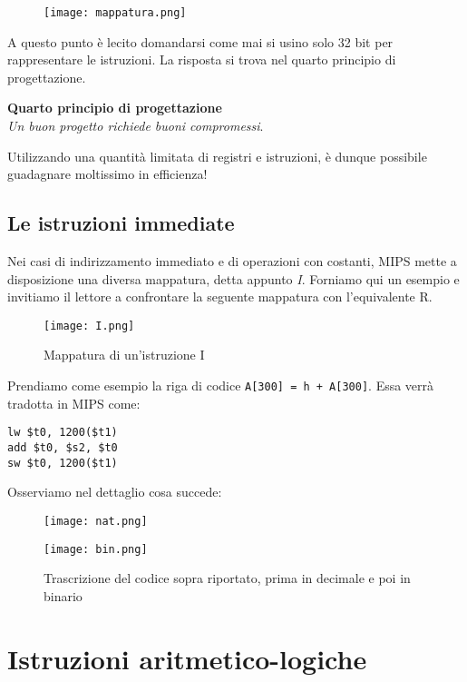 \begin{figure}[H]
	\centering
	\texttt{[image: mappatura.png]}
\end{figure}

A questo punto è lecito domandarsi come mai si usino solo 32 bit per rappresentare le istruzioni. La risposta si trova nel quarto principio di progettazione.

\vspace{8pt}
\begin{tcolorbox}
\centering
\textbf{Quarto principio di progettazione}\\
\emph{Un buon progetto richiede buoni compromessi}.
\end{tcolorbox}
\vspace{5pt}

Utilizzando una quantità limitata di registri e istruzioni, è dunque possibile guadagnare moltissimo in efficienza!

\subsection{Le istruzioni immediate}
Nei casi di indirizzamento immediato e di operazioni con costanti, MIPS mette a disposizione una diversa mappatura, detta appunto \emph{I}. Forniamo qui un esempio e invitiamo il lettore a confrontare la seguente mappatura con l'equivalente R.
\begin{figure}[H]
	\centering
	\texttt{[image: I.png]}
	\caption{Mappatura di un'istruzione I}
\end{figure}

Prendiamo come esempio la riga di codice \texttt{A[300] = h + A[300]}. Essa verrà tradotta in MIPS come:
\begin{verbatim}
lw $t0, 1200($t1)
add $t0, $s2, $t0
sw $t0, 1200($t1)
\end{verbatim}
Osserviamo nel dettaglio cosa succede:
\begin{figure}[H]
	\centering
	\texttt{[image: nat.png]}
\end{figure}
\begin{figure}[H]
	\centering
	\texttt{[image: bin.png]}
	\caption{Trascrizione del codice sopra riportato, prima in decimale e poi in binario}
\end{figure}

\section{Istruzioni aritmetico-logiche}

